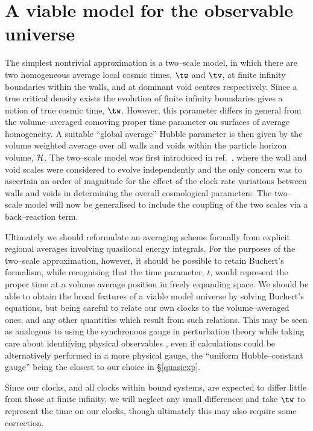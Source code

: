 \documentclass[12pt]{iopart}
\begin{document}
\section{A viable model for the observable universe\label{Have}}

The simplest nontrivial approximation is a two--scale model, in which
there are two homogeneous average local cosmic times, $\tw$ and $\tv$,
at finite infinity boundaries within the walls, and at dominant void
centres respectively. Since a true critical density exists the evolution
of finite infinity boundaries gives a notion of true cosmic time, $\tw$.
However, this parameter differs in general from the volume--averaged comoving
proper time parameter on surfaces of average homogeneity. A suitable
``global average'' Hubble parameter is then given by the volume weighted
average over all walls and voids within the particle horizon volume, $\cal
H$. The two--scale model was first introduced in ref.\ \cite{paper0},
where the wall and void scales were considered to evolve independently
and the only concern was to ascertain an order of magnitude for the
effect of the clock rate variations between walls and voids in determining
the overall cosmological parameters. The two--scale model will now
be generalised to include the coupling of the two scales via a
back--reaction term.

Ultimately we should reformulate an averaging scheme formally from explicit
regional averages involving quasilocal energy integrals. For the purposes of
the two--scale approximation, however, it should be possible to retain
Buchert's formalism, while recognising that the time parameter, $t$, would
represent the proper time at a volume average position in freely expanding
space. We should be able to obtain the broad features of a viable model
universe by solving Buchert's equations, but being careful to relate our
own clocks to the volume--averaged ones, and any other quantities which
result from such relations. This may be seen as analogous to using the
synchronous gauge in perturbation theory while taking care about identifying
physical observables \cite{PV}, even if calculations could be alternatively
performed in a more physical gauge, the ``uniform Hubble--constant gauge''
\cite{Bard} being the closest to our choice in \S\ref{quasiexp}.

Since our clocks, and all clocks within bound systems, are
expected to differ little from those at finite infinity, we will neglect
any small differences and take $\tw$ to represent the time on our clocks,
though ultimately this may also require some correction.
\end{document}
